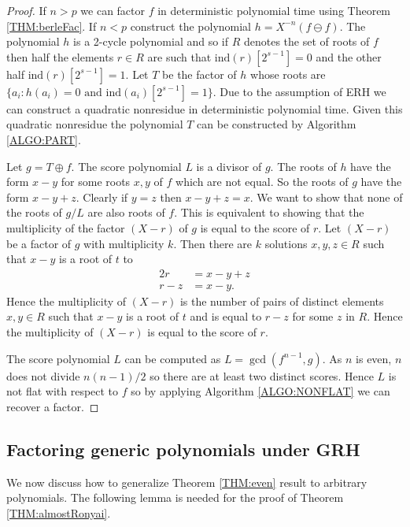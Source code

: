 \documentclass{article}
\theoremstyle{plain}
\theoremstyle{definition}
\def\ind {{ \mathrm{ind} }}
\begin{document}
		\begin{proof}
		    If $n>p$ we can factor $f$ in deterministic polynomial time using Theorem \ref{THM:berleFac}. If $n<p$ construct the polynomial $h=X^{-n}(f \ominus f)$. The polynomial $h$ is a 2-cycle polynomial and so if $R$ denotes the set of roots of $f$ then half the elements $r \in R$ are such that $\ind(r)[2^{s-1}]=0$ and the other half $\ind(r)[2^{s-1}]=1$. Let $T$ be the factor of $h$ whose roots are $\{a_i : h(a_i)=0 \textrm{ and } \ind(a_i)[2^{s-1}]=1  \}$. Due to the assumption of ERH we can construct a quadratic nonresidue in deterministic polynomial time. Given this quadratic nonresidue the polynomial $T$ can be constructed by Algorithm \ref{ALGO:PART}.

				Let $g=T \oplus f$. The score polynomial $L$ is a divisor of $g$. The roots of $h$ have the form $x-y$ for some roots $x,y$ of $f$ which are not equal. So the roots of $g$ have the form $x-y+z$. Clearly if $y=z$ then $x-y+z=x$. We want to show that none of the roots of $g/L$ are also roots of $f$. This is equivalent to showing that the multiplicity of the factor $(X-r)$ of $g$ is equal to the score of $r$. Let $(X-r)$ be a factor of $g$ with multiplicity $k$. Then there are $k$ solutions $x,y,z \in R$ such that $x-y$ is a root of $t$ to 
		    \begin{alignat*}{2}
		        r   &=x-y+z \\
				    r-z &= x-y.
	      \end{alignat*}
		    Hence the multiplicity of $(X-r)$ is the number of pairs of distinct elements $x,y \in R$ such that $x-y$ is a root of $t$ and is equal to $r-z$ for some $z$ in $R$. Hence the multiplicity of $(X-r)$ is equal to the score of $r$.  
				
				The score polynomial $L$ can be computed as $L=\gcd(f^{n-1},g)$. As $n$ is even, $n$ does not divide $n(n-1)/2$ so there are at least two distinct scores. Hence $L$ is not flat with respect to $f$ so by applying Algorithm \ref{ALGO:NONFLAT} we can recover a factor. 
		\end{proof}
			
		\subsection{Factoring generic polynomials under GRH}
		We now discuss how to generalize Theorem \ref{THM:even} result to arbitrary polynomials. The following lemma is needed for the proof of Theorem \ref{THM:almostRonyai}. 
		
\end{document}
